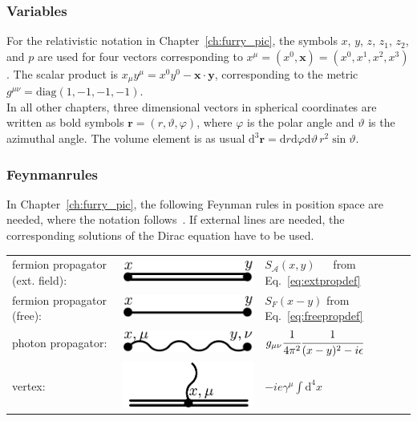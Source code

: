 \subsubsection*{Variables}
For the relativistic notation in Chapter~\ref{ch:furry_pic}, the symbols $x$, $y$, $z$, $z_1$, $z_2$, and $p$ are used for four vectors corresponding to $x^\mu=(x^0,\mathbf{x})=(x^0,x^1,x^2,x^3)$. The scalar product is $x_\mu y^\mu = x^0 y^0 - \mathbf{x}\cdot\mathbf{y}$, corresponding to the metric $g^{\mu\nu}=\text{diag}(1,-1,-1,-1)$.\\
In all other chapters, three dimensional vectors in spherical coordinates are written as bold symbols $\mathbf{r}=(r,\vartheta,\varphi)$, where $\varphi$ is the polar angle and $\vartheta$ is the azimuthal angle. The volume element is as usual $\text{d}^3\mathbf{r}=\text{d}r\text{d}\varphi\text{d}\vartheta\, r^2 \sin\vartheta $.
\subsubsection*{Feynmanrules}
In Chapter~\ref{ch:furry_pic}, the following Feynman rules in position space are needed, where the notation follows~\cite{itzykson2005}. If external lines are needed, the corresponding solutions of the Dirac equation have to be used.\\

\begin{tabular}{lll}
fermion propagator (ext. field):&\includegraphics[width=0.2\linewidth]{pics/feynrule_1.pdf} & $S_{\mathcal{A}}(x,y)\phantom{-}$ from Eq.~\eqref{eq:extpropdef}\\[7pt]
fermion propagator (free):&\includegraphics[width=0.2\linewidth]{pics/feynrule_2.pdf} &$S_{F}(x-y)$ from Eq.~\eqref{eq:freepropdef}\\[7pt]
photon propagator:&\includegraphics[width=0.2\linewidth]{pics/feynrule_3.pdf} &$g_{\mu\nu}\cfrac{1}{4\pi^2}\cfrac{1}{(x-y)^2-i\epsilon}$\\[7pt]
vertex:&\includegraphics[width=0.2\linewidth]{pics/feynrule_4.pdf} &$-ie\gamma^\mu\int\text{d}^4x$
\end{tabular}
